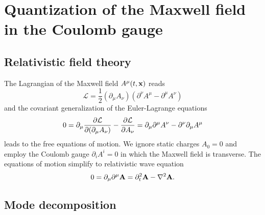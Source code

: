 \section{Quantization of the Maxwell field in the Coulomb gauge}

\subsection{Relativistic field theory}

The Lagrangian of the Maxwell field $A^\mu(t,\vb{x})$ reads~\cite[p.~339]{Srednicki2007}
\begin{equation}
	\mathcal{L}
	=
	\frac{1}{2}
	(\partial_\mu A_\nu)
	\left(
		\partial^\nu A^\mu
		-
		\partial^\mu A^\nu
	\right)
\end{equation}
and the covariant generalization of the Euler-Lagrange equations
\begin{equation}
	0
	=
	\partial_\mu
	\pdv{\mathcal{L}}{(\partial_\mu A_\nu)}
	-
	\pdv{\mathcal{L}}{A_\nu}
	=
	\partial_\mu\partial^\mu A^\nu
	-
	\partial^\nu\partial_\mu A^\mu
\end{equation}
leads to the free equations of motion.
We ignore static charges $A_0=0$ and employ the Coulomb gauge $\partial_iA^i=0$ in which the Maxwell field is transverse.
The equations of motion simplify to relativistic wave equation
\begin{equation}
	0
	=
	\partial_\mu\partial^\mu\vb{A}
	=
	\partial_t^2\vb{A}
	-
	\laplacian\vb{A}
	.
\end{equation}

\subsection{Mode decomposition}

